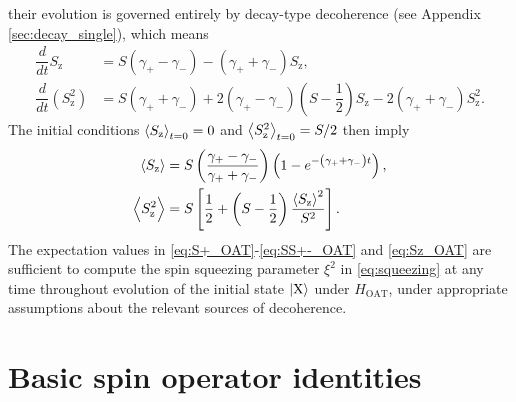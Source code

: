 \documentclass[pra,reprint,longbibliography]{revtex4-1}
\renewcommand{\t}{\text} %
\newcommand{\f}[2]{\dfrac{#1}{#2}} %
\newcommand{\p}[1]{\left(#1\right)} %
\renewcommand{\sp}[1]{\left[#1\right]} %
\newcommand{\bk}{\Braket} %
\newcommand{\z}{\text{z}}
\newcommand{\X}{\text{X}}
\newcommand{\1}{\mathds{1}}
\begin{document}
their evolution is governed entirely by decay-type decoherence (see
Appendix \ref{sec:decay_single}), which means
\begin{align}
  \f{d}{dt} S_\z
  &= S\p{\gamma_+-\gamma_-} - \p{\gamma_++\gamma_-} S_\z,
  \\
  \f{d}{dt}\p{S_\z^2}
  &= S\p{\gamma_++\gamma_-} + 2\p{\gamma_+-\gamma_-}\p{S-\f12} S_\z
  - 2 \p{\gamma_++\gamma_-} S_\z^2.
\end{align}
The initial conditions $\bk{S_\z}_{t=0}=0$ and $\bk{S_\z^2}_{t=0}=S/2$
then imply
\begin{align}
  \bk{S_\z}
  &= S\p{\f{\gamma_+-\gamma_-}{\gamma_++\gamma_-}}
  \p{1-e^{-\p{\gamma_+ + \gamma_-} t}}, \\
  \bk{S_\z^2} &= S \sp{\f12 + \p{S-\f12} \f{\bk{S_\z}^2}{S^2}}.
  \label{eq:Sz_OAT}
\end{align}
The expectation values in \eqref{eq:S+_OAT}-\eqref{eq:SS+-_OAT} and
\eqref{eq:Sz_OAT} are sufficient to compute the spin squeezing
parameter $\xi^2$ in \eqref{eq:squeezing} at any time throughout
evolution of the initial state $\ket{\X}$ under $H_{\t{OAT}}$, under
appropriate assumptions about the relevant sources of decoherence.


\section{Basic spin operator identities}
\label{sec:identities}
\end{document}
